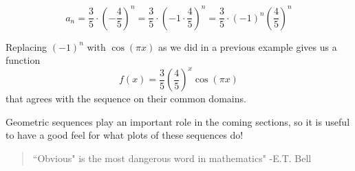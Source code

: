 \documentclass{ximera}
\begin{document}
\[
a_n = \frac{3}{5} \cdot \left( -\frac{4}{5}\right)^n = \frac{3}{5} \cdot \left( - 1 \cdot \frac{4}{5}\right)^n =\frac{3}{5} \cdot (-1)^n \left(\frac{4}{5}\right)^n
\]

Replacing $(-1)^n$ with $\cos(\pi x)$ as we did in a previous example gives us a function \[f(x) = \frac{3}{5} \left(\frac{4}{5}\right)^x \cos(\pi x)\] that agrees with the sequence on their common domains.

Geometric sequences play an important role in the coming sections, so it is useful to have a good feel for what plots of these sequences do!

\begin{quote}
``Obvious" is the most dangerous word in mathematics" -E.T. Bell
\end{quote}
\end{document}
